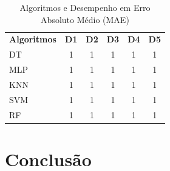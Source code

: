 \documentclass[12pt]{article}
\begin{document}
\begin{table}[h!]
  \begin{center}
    \caption{Algoritmos e Desempenho em Erro Absoluto Médio (MAE) }
    \label{tab_desempenho}
    \begin{tabular}{l|c|c|c|c|c}
      \textbf{Algoritmos} & \textbf{D1} & \textbf{D2} & \textbf{D3} & \textbf{D4} & \textbf{D5} \\
      DT                  & 1           & 1           & 1           & 1           & 1           \\
      MLP                 & 1           & 1           & 1           & 1           & 1           \\
      KNN                 & 1           & 1           & 1           & 1           & 1           \\
      SVM                 & 1           & 1           & 1           & 1           & 1           \\
      RF                  & 1           & 1           & 1           & 1           & 1           \\
    \end{tabular}
  \end{center}
\end{table}



\section{Conclusão}\label{sec:figs}




\end{document}
